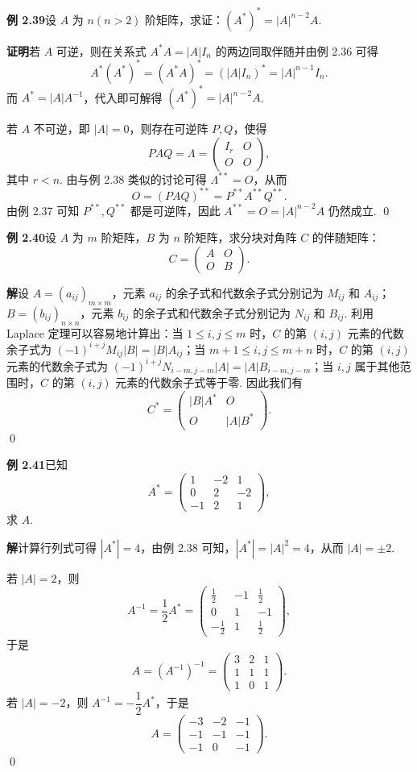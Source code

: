 \documentclass[UTF8,12pt,a4paper,fontset=fandol]{ctexart}
\begin{document}
\noindent\textbf{例 2.39}\quad 设 $A$ 为 $n(n>2)$ 阶矩阵，求证：$(A^*)^*=|A|^{n-2}A$.

\noindent\textbf{证明}\quad 若 $A$ 可逆，则在关系式 $A^*A=|A|I_n$ 的两边同取伴随并由例 2.36 可得
\[
A^*(A^*)^*=(A^*A)^*=(|A|I_n)^*=|A|^{n-1}I_n.
\]
而 $A^*=|A|A^{-1}$，代入即可解得 $(A^*)^*=|A|^{n-2}A$.

若 $A$ 不可逆，即 $|A|=0$，则存在可逆阵 $P,Q$，使得
\[
PAQ=\Lambda=
\left(
\begin{array}{cc}
I_r & O\\
O & O
\end{array}
\right),
\]
其中 $r<n$. 由与例 2.38 类似的讨论可得 $\Lambda^{**}=O$，从而
\[
O=(PAQ)^{**}=P^{**}A^{**}Q^{**}.
\]
由例 2.37 可知 $P^{**},Q^{**}$ 都是可逆阵，因此 $A^{**}=O=|A|^{n-2}A$ 仍然成立. \qed

\noindent\textbf{例 2.40}\quad 设 $A$ 为 $m$ 阶矩阵，$B$ 为 $n$ 阶矩阵，求分块对角阵 $C$ 的伴随矩阵：
\[
C=
\left(
\begin{array}{cc}
A & O\\
O & B
\end{array}
\right).
\]

\noindent\textbf{解}\quad 设 $A=(a_{ij})_{m\times m}$，元素 $a_{ij}$ 的余子式和代数余子式分别记为 $M_{ij}$ 和 $A_{ij}$；$B=(b_{ij})_{n\times n}$，元素 $b_{ij}$ 的余子式和代数余子式分别记为 $N_{ij}$ 和 $B_{ij}$. 利用 Laplace 定理可以容易地计算出：当 $1\le i,j\le m$ 时，$C$ 的第 $(i,j)$ 元素的代数余子式为 $(-1)^{i+j}M_{ij}|B|=|B|A_{ij}$；当 $m+1\le i,j\le m+n$ 时，$C$ 的第 $(i,j)$ 元素的代数余子式为 $(-1)^{i+j}N_{i-m,j-m}|A|=|A|B_{i-m,j-m}$；当 $i,j$ 属于其他范围时，$C$ 的第 $(i,j)$ 元素的代数余子式等于零. 因此我们有
\[
C^*=
\left(
\begin{array}{cc}
|B|A^* & O\\
O & |A|B^*
\end{array}
\right).
\]
\qed

\noindent\textbf{例 2.41}\quad 已知
\[
A^*=
\left(
\begin{array}{rrr}
1 & -2 & 1\\
0 & 2 & -2\\
-1 & 2 & 1
\end{array}
\right),
\]
求 $A$.

\noindent\textbf{解}\quad 计算行列式可得 $|A^*|=4$，由例 2.38 可知，$|A^*|=|A|^2=4$，从而 $|A|=\pm2$.

若 $|A|=2$，则
\[
A^{-1}=\frac12 A^*=
\left(
\begin{array}{rrr}
\frac12 & -1 & \frac12\\
0 & 1 & -1\\
-\frac12 & 1 & \frac12
\end{array}
\right),
\]
于是
\[
A=(A^{-1})^{-1}=
\left(
\begin{array}{ccc}
3 & 2 & 1\\
1 & 1 & 1\\
1 & 0 & 1
\end{array}
\right).
\]
若 $|A|=-2$，则 $A^{-1}=-\dfrac12 A^*$，于是
\[
A=
\left(
\begin{array}{rrr}
-3 & -2 & -1\\
-1 & -1 & -1\\
-1 & 0 & -1
\end{array}
\right).
\]
\qed
\end{document}
